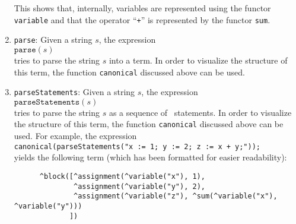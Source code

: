 \begin{enumerate}
      This shows that, internally, variables are represented using the functor
      \texttt{variable} and that the operator ``\texttt{+}'' is represented by
      the functor \texttt{sum}.
\item \texttt{parse}:  Given a string $s$, the expression
      \\[0.2cm]
      \hspace*{1.3cm}
      $\mathtt{parse}(s)$ 
      \\[0.2cm]
      tries to parse the string $s$ into a term.  In order to visualize the structure of
      this term,  the function \texttt{canonical} discussed above can be used.      
\item \texttt{parseStatements}:  Given a string $s$, the expression
      \\[0.2cm]
      \hspace*{1.3cm}
      $\mathtt{parseStatements}(s)$ 
      \\[0.2cm]
      tries to parse the string $s$ as a sequence of \setlx\ statements.   In order to visualize the structure of
      this term,  the function \texttt{canonical} discussed above can be used.  For
      example, the expression
      \\[0.2cm]
      \hspace*{1.3cm}
      \texttt{canonical(parseStatements("x := 1; y := 2; z := x + y;"));}
      \\[0.2cm]
      yields the following term (which has been formatted for easier readability):
\begin{verbatim}
      ^block([^assignment(^variable("x"), 1), 
              ^assignment(^variable("y"), 2), 
              ^assignment(^variable("z"), ^sum(^variable("x"), ^variable("y")))
             ])
\end{verbatim}
\end{enumerate}

